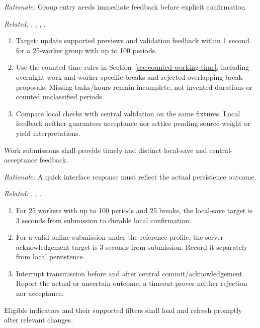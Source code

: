 \textit{Rationale:} Group entry needs immediate feedback before explicit confirmation.

\textit{Related:} \hyperref[fr:026]{}, \hyperref[fr:031]{}, \hyperref[fr:032]{}, \hyperref[fr:033]{}.
\begin{enumerate}[label=(\alph*),leftmargin=*,itemsep=1pt,topsep=3pt]
\item Target: update supported previews and validation feedback within 1 second for a 25-worker group with up to 100 periods.
\item Use the counted-time rules in Section~\ref{sec:counted-working-time}, including overnight work and worker-specific breaks and rejected overlapping-break proposals. Missing tasks/hours remain incomplete, not invented durations or counted unclassified periods.
\item Compare local checks with central validation on the same fixtures. Local feedback neither guarantees acceptance nor settles pending source-weight or yield interpretations.
\end{enumerate}

\label{nfr:PERF-04}
Work submissions shall provide timely and distinct local-save and central-acceptance feedback.

\textit{Rationale:} A quick interface response must reflect the actual persistence outcome.

\textit{Related:} \hyperref[fr:029]{}, \hyperref[fr:034]{}, \hyperref[fr:037]{}.
\begin{enumerate}[label=(\alph*),leftmargin=*,itemsep=1pt,topsep=3pt]
\item For 25 workers with up to 100 periods and 25 breaks, the local-save target is 3 seconds from submission to durable local confirmation.
\item For a valid online submission under the reference profile, the server-acknowledgement target is 3 seconds from submission. Record it separately from local persistence.
\item Interrupt transmission before and after central commit/acknowledgement. Report the actual or uncertain outcome; a timeout proves neither rejection nor acceptance.
\end{enumerate}

\label{nfr:PERF-05}
Eligible indicators and their supported filters shall load and refresh promptly after relevant changes.

